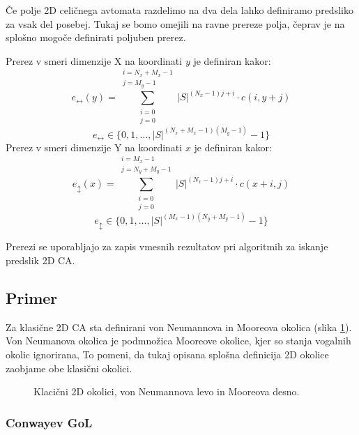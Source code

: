 \documentclass[12pt,a4paper,openany,twoside]{book}
\begin{document}
Če polje 2D celičnega avtomata razdelimo na dva dela
lahko definiramo predsliko za vsak del posebej.
Tukaj se bomo omejili na ravne prereze polja,
čeprav je na splošno mogoče definirati poljuben prerez.

Prerez v smeri dimenzije X na koordinati \(y\) je definiran kakor:
\begin{equation}
e_{\leftrightarrow}(y) = \sum_{\substack{i=0 \\ j=0}}^{\substack{i=N_x+M_x-1 \\ j=M_y-1}} |S|^{(N_x-1) j + i} \cdot c(i,y+j)
\end{equation}
\begin{equation}
e_{\leftrightarrow} \in \{0, 1, \ldots, |S|^{(N_x+M_x-1)(M_y-1)}-1\}
\end{equation}
Prerez v smeri dimenzije Y na koordinati \(x\) je definiran kakor:
\begin{equation}
e_{\updownarrow}(x) = \sum_{\substack{i=0 \\ j=0}}^{\substack{i=M_x-1 \\ j=N_y+M_y-1}} |S|^{(N_x-1) j + i} \cdot c(x+i,j)
\end{equation}
\begin{equation}
e_{\updownarrow} \in \{0, 1, \ldots, |S|^{(M_x-1)(N_y+M_y-1)}-1\}
\end{equation}

Prerezi se uporabljajo za zapis vmesnih rezultatov pri algoritmih za iskanje predslik 2D CA.

\subsection{Primer}

Za klasične 2D CA sta definirani von Neumannova in Mooreova okolica (slika \ref{neighborhood_classic}).
Von Neumanova okolica je podmnožica Mooreove okolice, kjer so stanja vogalnih okolic ignorirana,
To pomeni, da tukaj opisana splošna definicija 2D okolice zaobjame obe klasični okolici.

\begin{figure}[htb]
\centerline{}
\caption[Klasične 2D okolice.]
{Klacični 2D okolici, von Neumannova levo in Mooreova desno.}
\label{neighborhood_classic}
\end{figure}

\subsubsection{Conwayev GoL}
\end{document}
